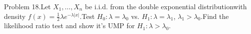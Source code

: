 \documentclass[preview]{standalone}
\begin{document}
\begin{center}
Problem 18.Let $X_1,\dots,X_n$ be i.i.d. from the double exponential distributionwith density $f(x)=\frac12\lambda e^{-\lambda|x|}$.Test $H_0:\lambda=\lambda_0$ vs. $H_1:\lambda=\lambda_1$, $\lambda_1>\lambda_0$.Find the likelihood ratio test and show it's UMP for $H_1:\lambda>\lambda_0$.
\end{center}
\end{document}
